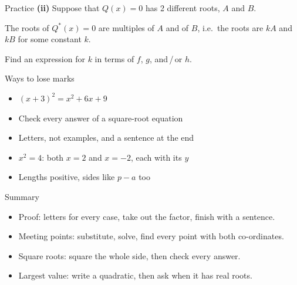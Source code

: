 \documentclass[aspectratio=169,11pt,xcolor=table,t]{beamer}
\newcommand\hp[1]{\fref{Handout p.\pageref{H-#1}}}
\begin{document}
\begin{frame}{Practice}
\relax
\textbf{(ii)} Suppose that $Q(x) = 0$ has 2 different roots, $A$ and $B$.\par\smallskip
The roots of $Q^{*}(x) = 0$ are multiples of $A$ and of $B$, i.e.\ the roots are $kA$ and $kB$ for some constant $k$.\par\smallskip
Find an expression for $k$ in terms of $f$, $g$, and\,/\,or $h$.
\end{frame}

\begin{frame}{Ways to lose marks}
\relax
\begin{itemize}
\item \textbf{} $(x + 3)^{2} = x^{2} + 6x + 9$
\item \textbf{} Check every answer of a square-root equation
\item \textbf{} Letters, not examples, and a sentence at the end
\item \textbf{} $x^{2} = 4$: both $x = 2$ and $x = -2$, each with its $y$
\item \textbf{} Lengths positive, sides like $p - a$ too
\end{itemize}
\hp{h4:lose}
\end{frame}

\begin{frame}{Summary}
\relax
\begin{itemize}
\item Proof: letters for every case, take out the factor, finish with a sentence.
\item Meeting points: substitute, solve, find every point with both co-ordinates.
\item Square roots: square the whole side, then check every answer.
\item Largest value: write a quadratic, then ask when it has real roots.
\end{itemize}
\hp{h4:proof}
\end{frame}
\end{document}
